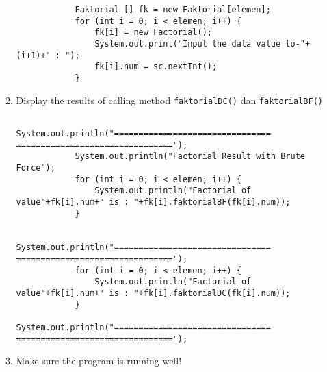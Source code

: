 \documentclass[12pt,titlepage]{article}
\begin{document}
\begin{enumerate}
\begin{enumerate}
        \begin{verbatim}
            Faktorial [] fk = new Faktorial[elemen];
            for (int i = 0; i < elemen; i++) {
                fk[i] = new Factorial();
                System.out.print("Input the data value to-"+(i+1)+" : ");
                fk[i].num = sc.nextInt();
            }
        \end{verbatim}
        \item Display the results of calling method \texttt{faktorialDC()} dan \texttt{faktorialBF()}
        \begin{verbatim}
            System.out.println("================================ ================================");
            System.out.println("Factorial Result with Brute Force");
            for (int i = 0; i < elemen; i++) {
                System.out.println("Factorial of value"+fk[i].num+" is : "+fk[i].faktorialBF(fk[i].num));
            }
            
            System.out.println("================================ ================================");
            for (int i = 0; i < elemen; i++) {
                System.out.println("Factorial of value"+fk[i].num+" is : "+fk[i].faktorialDC(fk[i].num));
            }
            System.out.println("================================ ================================");
        \end{verbatim}
        \item Make sure the program is running well!
    \end{enumerate}
\end{enumerate}
\end{document}
